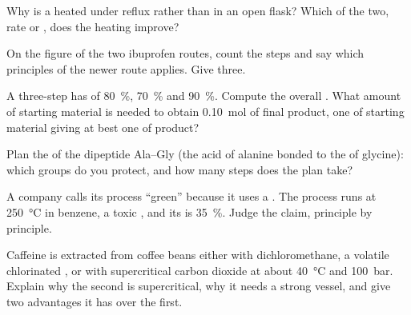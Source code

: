 \begin{exercise}[$\star\star$]\label{exo:g12:synthesis-strategy:10}
Why is a  heated under reflux rather than in an open flask? Which
of the two, rate or , does the heating improve?
\end{exercise}

\begin{exercise}[$\star\star$]\label{exo:g12:synthesis-strategy:11}
On the figure of the two ibuprofen routes, count the steps and say which
principles of  the newer route applies. Give three.
\end{exercise}

\begin{exercise}[$\star\star\star$]\label{exo:g12:synthesis-strategy:12}
A three-step  has  of \qty{80}{\percent},
\qty{70}{\percent} and \qty{90}{\percent}. Compute the overall .
What amount of starting material is needed to obtain \qty{0.10}{mol} of
final product, one  of starting material giving at best one  of
product?
\end{exercise}

\begin{exercise}[$\star\star\star$]\label{exo:g12:synthesis-strategy:13}
Plan the  of the dipeptide Ala--Gly (the acid of alanine bonded
to the  of glycine): which groups do you protect, and how many steps
does the plan take?
\end{exercise}

\begin{exercise}[$\star\star\star$]\label{exo:g12:synthesis-strategy:14}
A company calls its process ``green'' because it uses a . The
process runs at \qty{250}{\celsius} in benzene, a toxic , and its
 is \qty{35}{\percent}. Judge the claim, principle by
principle.
\end{exercise}

\begin{exercise}[$\star\star\star$]\label{exo:g12:synthesis-strategy:15}
Caffeine is extracted from coffee beans either with dichloromethane, a
volatile chlorinated , or with supercritical carbon dioxide at
about \qty{40}{\celsius} and \qty{100}{bar}. Explain why the second is
supercritical, why it needs a strong vessel, and give two advantages it
has over the first.
\end{exercise}

